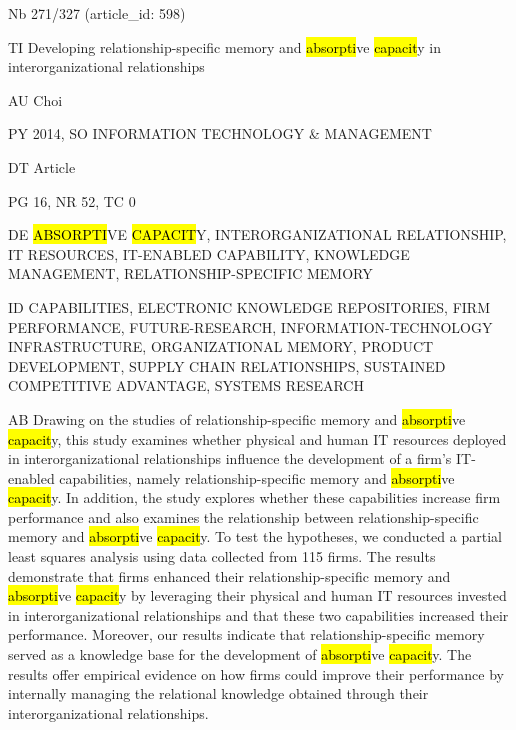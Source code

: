 \documentclass[a4paper]{article}
\begin{document}
\vspace*{-2cm}
Nb \tabto{0cm}271/327 (article\_id: 598)\par
TI \tabto{0cm}Developing relationship-specific memory and \hl{absorpti}ve \hl{capacit}y in interorganizational relationships\par
AU \tabto{0cm}Choi\par
PY \tabto{0cm}2014, SO INFORMATION TECHNOLOGY \& MANAGEMENT\par
DT \tabto{0cm}Article\par
PG \tabto{0cm}16, NR 52, TC 0\par
DE \tabto{0cm}\hl{ABSORPTI}VE \hl{CAPACIT}Y, INTERORGANIZATIONAL RELATIONSHIP, IT RESOURCES, IT-ENABLED CAPABILITY, KNOWLEDGE MANAGEMENT, RELATIONSHIP-SPECIFIC MEMORY\par
ID \tabto{0cm}CAPABILITIES, ELECTRONIC KNOWLEDGE REPOSITORIES, FIRM PERFORMANCE, FUTURE-RESEARCH, INFORMATION-TECHNOLOGY INFRASTRUCTURE, ORGANIZATIONAL MEMORY, PRODUCT DEVELOPMENT, SUPPLY CHAIN RELATIONSHIPS, SUSTAINED COMPETITIVE ADVANTAGE, SYSTEMS RESEARCH\par
AB \tabto{0cm}Drawing on the studies of relationship-specific memory and \hl{absorpti}ve \hl{capacit}y, this study examines whether physical and human IT resources deployed in interorganizational relationships influence the development of a firm's IT-enabled capabilities, namely relationship-specific memory and \hl{absorpti}ve \hl{capacit}y. In addition, the study explores whether these capabilities increase firm performance and also examines the relationship between relationship-specific memory and \hl{absorpti}ve \hl{capacit}y. To test the hypotheses, we conducted a partial least squares analysis using data collected from 115 firms. The results demonstrate that firms enhanced their relationship-specific memory and \hl{absorpti}ve \hl{capacit}y by leveraging their physical and human IT resources invested in interorganizational relationships and that these two capabilities increased their performance. Moreover, our results indicate that relationship-specific memory served as a knowledge base for the development of \hl{absorpti}ve \hl{capacit}y. The results offer empirical evidence on how firms could improve their performance by internally managing the relational knowledge obtained through their interorganizational relationships.\par
\clearpage
\end{document}

